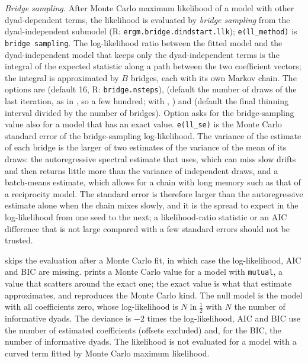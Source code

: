 \emph{Bridge sampling.} After Monte Carlo maximum likelihood of a model with other dyad-dependent terms, the likelihood is evaluated by \emph{bridge sampling} from the dyad-independent submodel (R: \texttt{ergm.bridge.dindstart.llk}); \texttt{e(ll\_method)} is \texttt{bridge sampling}. The log-likelihood ratio between the fitted model and the dyad-independent model that keeps only the dyad-independent terms is the integral of the expected statistic along a path between the two coefficient vectors; the integral is approximated by $B$ bridges, each with its own Markov chain. The options are  (default 16, R: \texttt{bridge.nsteps}),  (default the number of draws of the last iteration, as in \ergm{}, so a few hundred; with , ) and  (default the final thinning interval divided by the number of bridges). Option  asks for the bridge-sampling value also for a model that has an exact value. \texttt{e(ll\_se)} is the Monte Carlo standard error of the bridge-sampling log-likelihood. The variance of the estimate of each bridge is the larger of two estimates of the variance of the mean of its draws: the autoregressive spectral estimate that \ergm{} uses, which can miss slow drifts and then returns little more than the variance of independent draws, and a batch-means estimate, which allows for a chain with long memory such as that of a reciprocity model. The standard error is therefore larger than the autoregressive estimate alone when the chain mixes slowly, and it is the spread to expect in the log-likelihood from one seed to the next; a likelihood-ratio statistic or an AIC difference that is not large compared with a few standard errors should not be trusted.

 skips the evaluation after a Monte Carlo fit, in which case the log-likelihood, AIC and BIC are missing. \ergm{} prints a Monte Carlo value for a model with \texttt{mutual}, a value that scatters around the exact one; the exact value is what that estimate approximates, and  reproduces the Monte Carlo kind. The null model is the model with all coefficients zero, whose log-likelihood is $N\ln\frac12$ with $N$ the number of informative dyads. The deviance is $-2$ times the log-likelihood, AIC and BIC use the number of estimated coefficients (offsets excluded) and, for the BIC, the number of informative dyads. The likelihood is not evaluated for a model with a curved term fitted by Monte Carlo maximum likelihood.

